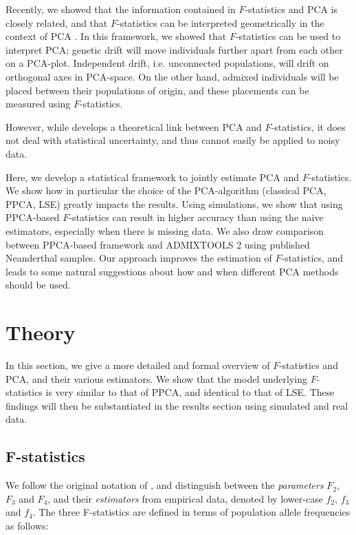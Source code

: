 \documentclass[12pt, letterpaper]{article}
\begin{document}
Recently, we showed that the information contained in $F$-statistics and PCA is closely related, and that $F$-statistics can be interpreted geometrically in the context of PCA \cite{peter_geometric_2022, oteo-garcia_geometrical_2021}. In this framework, we showed that $F$-statistics can be used to interpret PCA; genetic drift will move individuals further apart from each other on a PCA-plot. Independent drift, i.e. unconnected populations, will drift on orthogonal axes in PCA-space. On the other hand, admixed individuals will be placed between their populations of origin, and these placements can be measured using $F$-statistics.  

However, while \cite{peter_geometric_2022} develops a theoretical link between PCA and $F$-statistics, it does not deal with statistical uncertainty, and thus cannot easily be applied to noisy data. 

Here, we develop a statistical framework to jointly estimate PCA and $F$-statistics. We show how in particular the choice of the PCA-algorithm (classical PCA, PPCA, LSE) greatly impacts the results. Using simulations, we show that using PPCA-based $F$-statistics can result in higher accuracy than using the naive estimators, especially when there is missing data. We also draw comparison between PPCA-based framework and ADMIXTOOLS 2 using published Neanderthal samples. Our approach improves the estimation of $F$-statistics, and leads to some natural suggestions about how and when different PCA methods should be used.

\section{Theory}\label{theory}
In this section, we give a more detailed and formal overview of $F$-statistics and PCA, and their various estimators. We show that the model underlying $F$-statistics is very similar to that of PPCA, and identical to that of LSE. These findings will then be substantiated in the results section using simulated and real data.

\subsection{F-statistics}\label{fstats}
We follow the original notation of \cite{patterson_ancient_2012}, and distinguish between the \textit{parameters} $F_2$, $F_3$ and $F_4$, and their \textit{estimators} from empirical data, denoted by lower-case $f_2$, $f_3$ and $f_4$. The three F-statistics are defined in terms of population allele frequencies as follows:
\end{document}
